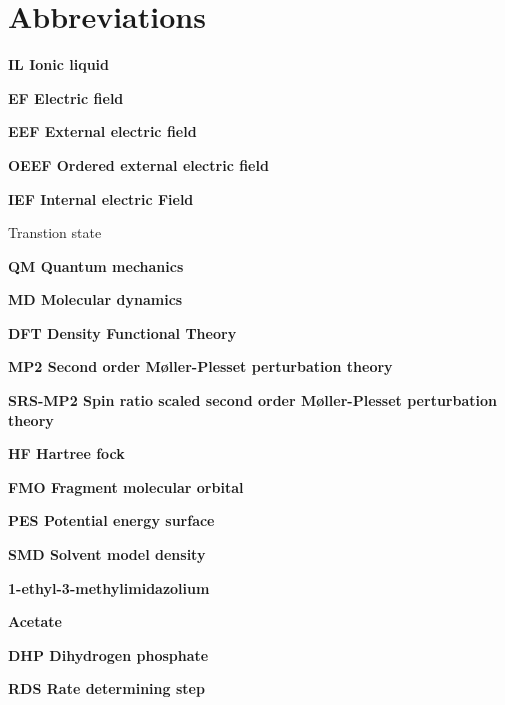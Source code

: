\section{Abbreviations}
\bf{IL} Ionic liquid

\bf{EF} Electric field

\bf{EEF} External electric field

\bf{OEEF} Ordered external electric field

\bf{IEF} Internal electric Field

 Transtion state

\bf{QM} Quantum mechanics

\bf{MD} Molecular dynamics

\bf{DFT} Density Functional Theory

\bf{MP2}  Second order M{\o}ller-Plesset perturbation theory

\bf{SRS-MP2} Spin ratio scaled second order M{\o}ller-Plesset perturbation theory

\bf{HF} Hartree fock

\bf{FMO} Fragment molecular orbital

\bf{PES} Potential energy surface

\bf{SMD} Solvent model density

\bf{} 1-ethyl-3-methylimidazolium

\bf{} Acetate

\bf{DHP} Dihydrogen phosphate

\bf{RDS} Rate determining step
